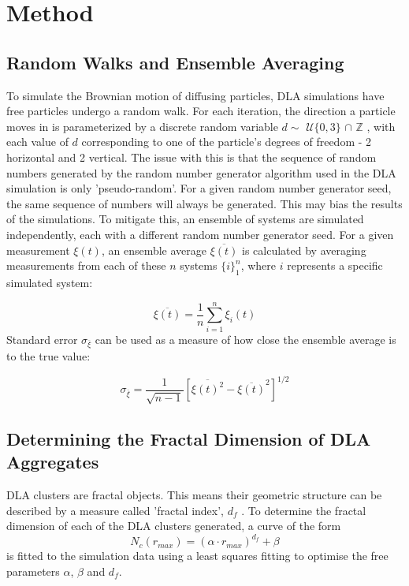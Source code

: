 \documentclass[11pt]{iopart}
\begin{document}
\section{Method}
\subsection{Random Walks and Ensemble Averaging}
To simulate the Brownian motion of diffusing particles, DLA simulations have free particles undergo a random walk. For each iteration, the direction a particle moves in is parameterized by a discrete random variable $d \sim$ $\mathcal{U}\{0, 3\}$ $\cap$ $\mathbb{Z}$ , with each value of $d$ corresponding to one of the particle's degrees of freedom - 2 horizontal and 2 vertical. The issue with this is that the sequence of random numbers generated by the random number generator algorithm used in the DLA simulation is only 'pseudo-random'. For a given random number generator seed, the same sequence of numbers will always be generated. This may bias the results of the simulations. To mitigate this, an ensemble of systems are simulated independently, each with a different random number generator seed. For a given measurement $\xi(t)$, an ensemble average $\overline{\xi(t)}$ is calculated by averaging measurements from each of these $n$ systems $\{i\}_1^n$, where $i$ represents a specific simulated system:


\begin{equation}
\overline{\xi(t)} = \frac{1}{n}\sum_{i=1}^{n}{\xi_i(t)}
\end{equation}
Standard error $\sigma_{\overline{\xi}}$ can be used as a measure of how close the ensemble average is to the true value:

\begin{equation}
\sigma_{\overline{\xi}} = \frac{1}{\sqrt{n-1}} \left[ \overline{\xi(t)^2} - \overline{\xi(t)}^2 \right]^{1/2}
\end{equation}

\subsection{Determining the Fractal Dimension of DLA Aggregates}

DLA clusters are fractal objects. This means their geometric structure can be described by a measure called 'fractal index', $d_f$ \cite{handout}. To determine the fractal dimension of each of the DLA clusters generated, a curve of the form
\begin{equation}
N_c(r_{max}) = (\alpha \cdot r_{max})^{d_f} + \beta
\end{equation}
is fitted to the simulation data using a least squares fitting to optimise the free parameters $\alpha$, $\beta$ and $d_f$. 
\end{document}

